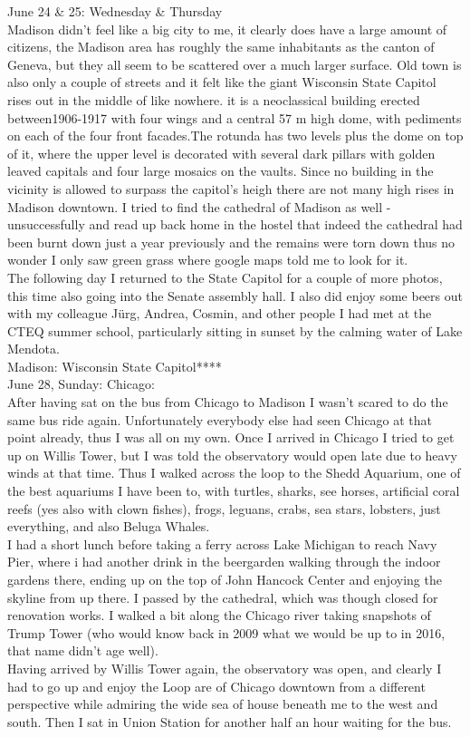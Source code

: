 June 24 \& 25: Wednesday \& Thursday\\
Madison didn't feel like a big city to me, it clearly does have a large amount of citizens, the Madison area has roughly the same inhabitants as the canton of Geneva, but they all seem to be scattered over a much larger surface. Old town is also only a couple of streets and it felt like the giant Wisconsin State Capitol rises out in the middle of like nowhere. it is a neoclassical building erected between1906-1917 with four wings and a central 57 m high dome, with pediments on each of the four front facades.The rotunda has two levels plus the dome on top of it, where the upper level is decorated with several dark pillars with golden leaved capitals and four large mosaics on the vaults. Since no building in the vicinity is allowed to surpass the capitol's heigh there are not many high rises in Madison downtown. I tried to find the cathedral of Madison as well - unsuccessfully and read up back home in the hostel that indeed the cathedral had been burnt down just a year previously and the remains were torn down thus no wonder I only saw green grass where google maps told me to look for it.\\
The following day I returned to the State Capitol for a couple of more photos, this time also going into the Senate assembly hall. I also did enjoy some beers out with my colleague J\"urg, Andrea, Cosmin, and other people I had met at the CTEQ summer school, particularly sitting in sunset by the calming water of Lake Mendota.\\

Madison: Wisconsin State Capitol****\\

June 28, Sunday: Chicago:\\
After having sat on the bus from Chicago to Madison I wasn't scared to do the same bus ride again. Unfortunately everybody else had seen Chicago at that point already, thus I was all on my own. Once I arrived in Chicago I tried to get up on Willis Tower, but I was told the observatory would open late due to heavy winds at that time. Thus I walked across the loop to the Shedd Aquarium, one of the best aquariums I have been to, with turtles, sharks, see horses, artificial coral reefs (yes also with clown fishes), frogs, leguans, crabs, sea stars, lobsters, just everything, and also Beluga Whales.\\
I had a short lunch before taking a ferry across Lake Michigan to reach Navy Pier, where i had another drink in the beergarden walking through the indoor gardens there, ending up on the top of John Hancock Center and enjoying the skyline from up there. I passed by the cathedral, which was though closed for renovation works. I walked a bit along the Chicago river taking snapshots of Trump Tower (who would know back in 2009 what we would be up to in 2016, that name didn't age well).\\
Having arrived by Willis Tower again, the observatory was open, and clearly I had to go up and enjoy the Loop are of Chicago downtown from a different perspective while admiring the wide sea of house beneath me to the west and south. Then I sat in Union Station for another half an hour waiting for the bus.\\

